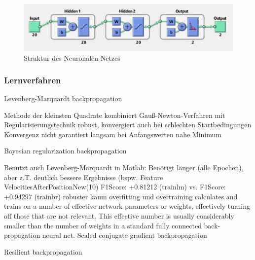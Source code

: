 \begin{figure}[!h]
    \centering
    \includegraphics[width=1\textwidth]{pics/NN-Structure.JPG}
    \caption{Struktur des Neuronalen Netzes}
    \label{fig:NNStructure}
\end{figure}

\subsubsection{Lernverfahren}
Levenberg-Marquardt backpropagation

Methode der kleinsten Quadrate
kombiniert Gauß-Newton-Verfahren mit Regularisierungstechnik
robust, konvergiert auch bei schlechten Startbedingungen
Konvergenz nicht garantiert
langsam bei Anfangswerten nahe Minimum

Bayesian regularization backpropagation

Benutzt auch Levenberg-Marquardt
in Matlab: Benötigt länger (alle Epochen), aber z.T. deutlich bessere Ergebnisse (bspw. Feature VelocitiesAfterPositionNew(10) F1Score: +0.81212 (trainlm) vs. F1Score: +0.94297 (trainbr)
robuster
kaum overfitting und overtraining
calculates and trains on a number of effective network parameters or weights, effectively turning off those that are not relevant. This effective number is usually considerably smaller than the number of weights in a standard fully connected back-propagation neural net.
Scaled conjugate gradient backpropagation

Resilient backpropagation
